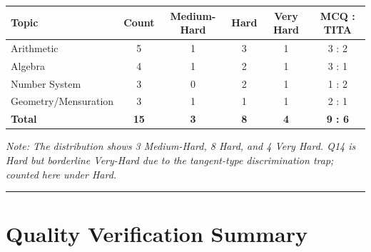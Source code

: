 \documentclass[11pt,a4paper]{article}
\begin{document}
\begin{center}
\renewcommand{\arraystretch}{1.25}
\begin{tabular}{|l|c|c|c|c|c|}
\hline
\textbf{Topic} & \textbf{Count} & \textbf{Medium-Hard} & \textbf{Hard} & \textbf{Very Hard} & \textbf{MCQ : TITA} \\
\hline
Arithmetic           & 5 & 1 & 3 & 1 & 3 : 2 \\
Algebra              & 4 & 1 & 2 & 1 & 3 : 1 \\
Number System        & 3 & 0 & 2 & 1 & 1 : 2 \\
Geometry/Mensuration & 3 & 1 & 1 & 1 & 2 : 1 \\
\hline
\textbf{Total}       & \textbf{15} & \textbf{3} & \textbf{8} & \textbf{4} & \textbf{9 : 6} \\
\hline
\end{tabular}
\end{center}

\textit{Note: The distribution shows 3 Medium-Hard, 8 Hard, and 4 Very Hard. Q14 is Hard but borderline Very-Hard due to the tangent-type discrimination trap; counted here under Hard.}

\vspace{0.4em}\hrule\vspace{0.6em}

\section*{Quality Verification Summary}
\end{document}
